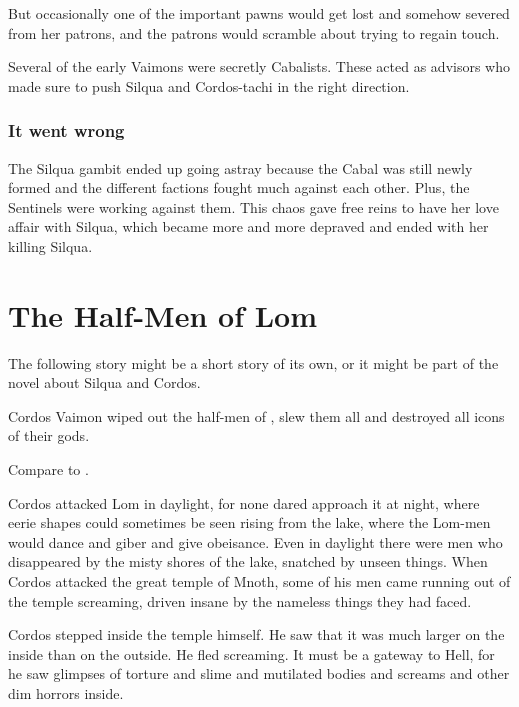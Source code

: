 But occasionally one of the important pawns would get lost and somehow severed from her patrons, and the patrons would scramble about trying to regain touch. 

Several of the early Vaimons were secretly Cabalists. 
These acted as advisors who made sure to push Silqua and Cordos-tachi in the right direction. 





\subsubsection{It went wrong}
The Silqua gambit ended up going astray because the Cabal was still newly formed and the different factions fought much against each other. 
Plus, the Sentinels were working against them. 
This chaos gave \Delphine free reins to have her love affair with Silqua, which became more and more depraved and ended with her killing Silqua. 















\section{The Half-Men of Lom}
The following story might be a short story of its own, or it might be part of the novel about Silqua and Cordos.

Cordos Vaimon wiped out the half-men of , slew them all and destroyed all icons of their gods.

Compare to \cite{HPLovecraft:TheDoomThatCametoSarnath}. 

Cordos attacked Lom in daylight, for none dared approach it at night, where eerie shapes could sometimes be seen rising from the lake, where the Lom-men would dance and giber and give obeisance. 
Even in daylight there were men who disappeared by the misty shores of the lake, snatched by unseen things. 
When Cordos attacked the great temple of Mnoth, some of his men came running out of the temple screaming, driven insane by the nameless things they had faced. 

Cordos stepped inside the temple himself.
He saw that it was much larger on the inside than on the outside. 
He fled screaming. 
It must be a gateway to Hell, for he saw glimpses of torture and slime and mutilated bodies and screams and other dim horrors inside. 


